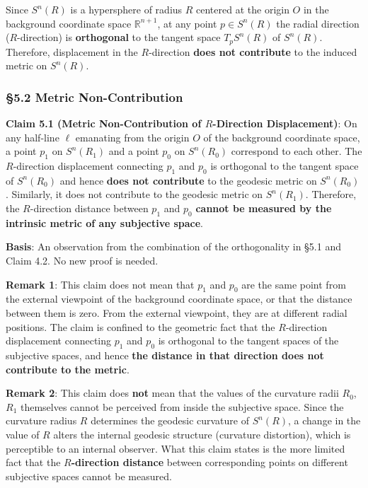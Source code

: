 \documentclass[
  a4paper,11pt]{article}
\begin{document}
Since \(S^n(R)\) is a hypersphere of radius \(R\) centered at the origin
\(O\) in the background coordinate space \(\mathbb{R}^{n+1}\), at any
point \(p \in S^n(R)\) the radial direction (\(R\)-direction) is
\textbf{orthogonal} to the tangent space \(T_p S^n(R)\) of \(S^n(R)\).
Therefore, displacement in the \(R\)-direction \textbf{does not
contribute} to the induced metric on \(S^n(R)\).

\subsubsection{§5.2 Metric
Non-Contribution}\label{metric-non-contribution}

\textbf{Claim 5.1 (Metric Non-Contribution of \(R\)-Direction
Displacement)}: On any half-line \(\ell\) emanating from the origin
\(O\) of the background coordinate space, a point \(p_1\) on
\(S^n(R_1)\) and a point \(p_0\) on \(S^n(R_0)\) correspond to each
other. The \(R\)-direction displacement connecting \(p_1\) and \(p_0\)
is orthogonal to the tangent space of \(S^n(R_0)\) and hence
\textbf{does not contribute} to the geodesic metric on \(S^n(R_0)\).
Similarly, it does not contribute to the geodesic metric on
\(S^n(R_1)\). Therefore, the \(R\)-direction distance between \(p_1\)
and \(p_0\) \textbf{cannot be measured by the intrinsic metric of any
subjective space}.

\textbf{Basis}: An observation from the combination of the orthogonality
in §5.1 and Claim 4.2. No new proof is needed.

\textbf{Remark 1}: This claim does not mean that \(p_1\) and \(p_0\) are
the same point from the external viewpoint of the background coordinate
space, or that the distance between them is zero. From the external
viewpoint, they are at different radial positions. The claim is confined
to the geometric fact that the \(R\)-direction displacement connecting
\(p_1\) and \(p_0\) is orthogonal to the tangent spaces of the
subjective spaces, and hence \textbf{the distance in that direction does
not contribute to the metric}.

\textbf{Remark 2}: This claim does \textbf{not} mean that the values of
the curvature radii \(R_0\), \(R_1\) themselves cannot be perceived from
inside the subjective space. Since the curvature radius \(R\) determines
the geodesic curvature of \(S^n(R)\), a change in the value of \(R\)
alters the internal geodesic structure (curvature distortion), which is
perceptible to an internal observer. What this claim states is the more
limited fact that the \textbf{\(R\)-direction distance} between
corresponding points on different subjective spaces cannot be measured.
\end{document}
